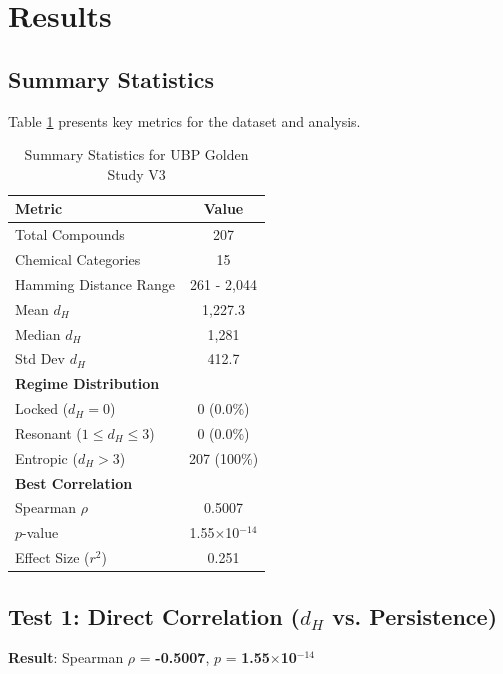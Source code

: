 \documentclass[11pt,letterpaper]{article}
\begin{document}
\section{Results}

\subsection{Summary Statistics}

Table \ref{tab:summary} presents key metrics for the dataset and analysis.

\begin{table}[H]
\centering
\caption{Summary Statistics for UBP Golden Study V3}
\label{tab:summary}
\begin{tabular}{lc}
\toprule
\textbf{Metric} & \textbf{Value} \\
\midrule
Total Compounds & 207 \\
Chemical Categories & 15 \\
Hamming Distance Range & 261 - 2,044 \\
Mean $d_H$ & 1,227.3 \\
Median $d_H$ & 1,281 \\
Std Dev $d_H$ & 412.7 \\
\midrule
\textbf{Regime Distribution} & \\
\quad Locked ($d_H = 0$) & 0 (0.0\%) \\
\quad Resonant ($1 \leq d_H \leq 3$) & 0 (0.0\%) \\
\quad Entropic ($d_H > 3$) & 207 (100\%) \\
\midrule
\textbf{Best Correlation} & \\
\quad Spearman $\rho$ & 0.5007 \\
\quad $p$-value & 1.55$\times$10$^{-14}$ \\
\quad Effect Size ($r^2$) & 0.251 \\
\bottomrule
\end{tabular}
\end{table}

\subsection{Test 1: Direct Correlation ($d_H$ vs. Persistence)}

\textbf{Result}: Spearman $\rho$ = \textbf{-0.5007}, $p$ = \textbf{1.55$\times$10$^{-14}$}
\end{document}
